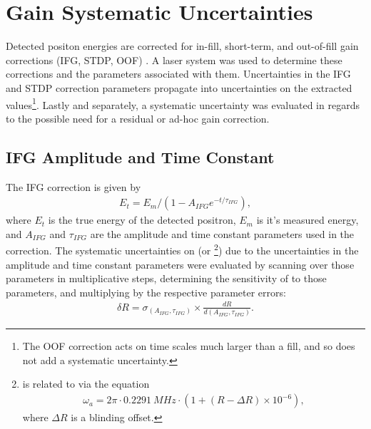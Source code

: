 
\graphicspath{{Body/Figures/Gain/IFG/60h/Amplitude/}{Body/Figures/Gain/IFG/60h/Amplitude-With-AdHoc/}{Body/Figures/Gain/IFG/60h/Lifetime/}{Body/Figures/Gain/IFG/9d/Lifetime/}{Body/Figures/Gain/ResidualGain/EnergyBinKloss/}{Body/Figures/Gain/ResidualGain/Chi2Min/}}

\section{Gain Systematic Uncertainties}


Detected positon energies are corrected for in-fill, short-term, and out-of-fill gain corrections (IFG, STDP, OOF) \cite[and references therein]{GainNote}. A laser system was used to determine these corrections and the parameters associated with them. Uncertainties in the IFG and STDP correction parameters propagate into uncertainties on the extracted \wa values\footnote{The OOF correction acts on time scales much larger than a fill, and so does not add a systematic uncertainty.}. Lastly and separately, a systematic uncertainty was evaluated in regards to the possible need for a residual or ad-hoc gain correction.



\subsection{IFG Amplitude and Time Constant}


The IFG correction is given by
\begin{align}
  E_{t} = E_{m}/(1 - A_{IFG} e^{-t/\tau_{IFG}}),
\end{align}
where $E_{t}$ is the true energy of the detected positron, $E_{m}$ is it's measured energy, and $A_{IFG}$ and $\tau_{IFG}$ are the amplitude and time constant parameters used in the correction. The systematic uncertainties on \wa (or \R\footnote{\R is related to \wa via the equation
\begin{align}
  \omega_{a} = 2\pi \cdot \SI{0.2291}{MHz} \cdot (1 + (R - \Delta R) \times 10^{-6}),
\label{eq:wa}
\end{align}
where $\Delta R$ is a blinding offset.}) due to the uncertainties in the amplitude and time constant parameters were evaluated by scanning over those parameters in multiplicative steps, determining the sensitivity of \R to those parameters, and multiplying by the respective parameter errors:
    \begin{align}
        \delta R = \sigma_{(A_{IFG}, \tau_{IFG})} \times \frac{dR}{d(A_{IFG}, \tau_{IFG})}.
    \end{align}


